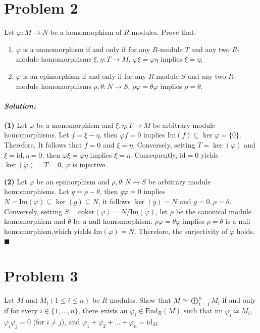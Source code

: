 \documentclass[12pt, a4paper]{article}
\newenvironment{solution}
  {\paragraph{\textit{Solution:}}\par\medskip}
  {\hfill$\blacksquare$\vspace{0.1cm}}
\begin{document}
\section*{Problem 2}
Let $\varphi : M \to N$ be a homomorphism of $R$-modules. Prove that:
\begin{enumerate}
    \item $\varphi$ is a monomorphism if and only if for any $R$-module $T$ and any two $R$-module homomorphisms $\xi, \eta : T \to M$, $\varphi\xi = \varphi\eta$ implies $\xi = \eta$;
    \item $\varphi$ is an epimorphism if and only if for any $R$-module $S$ and any two $R$-module homomorphisms $\rho, \theta : N \to S$, $\rho\varphi = \theta\varphi$ implies $\rho = \theta$.
\end{enumerate}

\begin{solution}
\textbf{(1)} Let $\varphi$ be a monomorphism and $\xi,\eta:T\to M$ be arbitrary module homomorphisms. Let $f=\xi-\eta$, then $\varphi f=0$ implies $\text{Im}(f)\subseteq \ker{\varphi} = \{0\}$. Therefore, It follows that $f=0$ and $\xi=\eta$.
Conversely, setting $T = \ker(\varphi)$ and $\xi=\text{id},\eta=0$, then $\varphi\xi = \varphi\eta$ implies $\xi=\eta$. Consequently, $\text{id}=0$ yields $\ker(\varphi)=T=0$, $\varphi$ is injective.

\textbf{(2)} Let $\varphi$ be an epimorphism and $\rho,\theta:N\to S$ be arbitrary module homomorphisms. Let $g=\rho-\theta$, then $g\varphi =0$ implies $N=\text{Im}(\varphi)\subseteq \ker(g)\subseteq N$, it follows $\ker(g)=N$ and $g=0,\rho=\theta$.
Conversely, setting $S=\text{coker}(\varphi)=  N/\text{Im}(\varphi)$, let $\rho$ be the canonical module homomorphism and $\theta$ be a null homomorphism. $\rho\varphi = \theta\varphi$ implies $\rho = \theta$ is a null homomorphism,which yields $\text{Im}(\varphi) = N$.
Therefore, the surjectivity of $\varphi$ holds. 
\end{solution}

\section*{Problem 3}
Let $M$ and $M_i(1 \le i \le n)$ be $R$-modules. Show that $M \simeq \bigoplus_{i=1}^n M_i$ if and only if for every $i \in \{1, \dots, n\}$, there exists an $\varphi_i \in \text{End}_R(M)$ such that $\text{im } \varphi_i \simeq M_i$, $\varphi_i\varphi_j = 0$ (for $i \neq j$), and $\varphi_1 + \varphi_2 + \dots + \varphi_n = \text{id}_M$.
\end{document}
